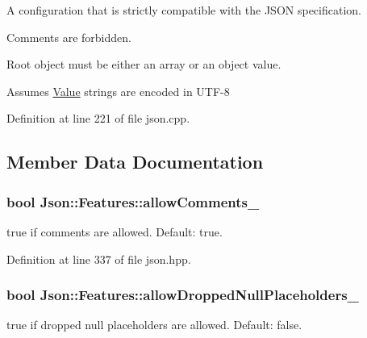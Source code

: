 A configuration that is strictly compatible with the J\-S\-O\-N specification. 


\begin{DoxyItemize}
\item Comments are forbidden.
\item Root object must be either an array or an object value.
\item Assumes \hyperlink{class_json_1_1_value}{Value} strings are encoded in U\-T\-F-\/8 
\end{DoxyItemize}

Definition at line 221 of file json.\-cpp.



\subsection{Member Data Documentation}
\hypertarget{class_json_1_1_features_a33afd389719624b6bdb23950b3c346c9}{
\subsubsection[{allow\-Comments\-\_\-}]{\setlength{\rightskip}{0pt plus 5cm}bool Json\-::\-Features\-::allow\-Comments\-\_\-}}\label{class_json_1_1_features_a33afd389719624b6bdb23950b3c346c9}


{\ttfamily true} if comments are allowed. Default\-: {\ttfamily true}. 



Definition at line 337 of file json.\-hpp.

\hypertarget{class_json_1_1_features_a5076aa72c05c7596ac339ede36c97a6a}{
\subsubsection[{allow\-Dropped\-Null\-Placeholders\-\_\-}]{\setlength{\rightskip}{0pt plus 5cm}bool Json\-::\-Features\-::allow\-Dropped\-Null\-Placeholders\-\_\-}}\label{class_json_1_1_features_a5076aa72c05c7596ac339ede36c97a6a}


{\ttfamily true} if dropped null placeholders are allowed. Default\-: {\ttfamily false}. 



